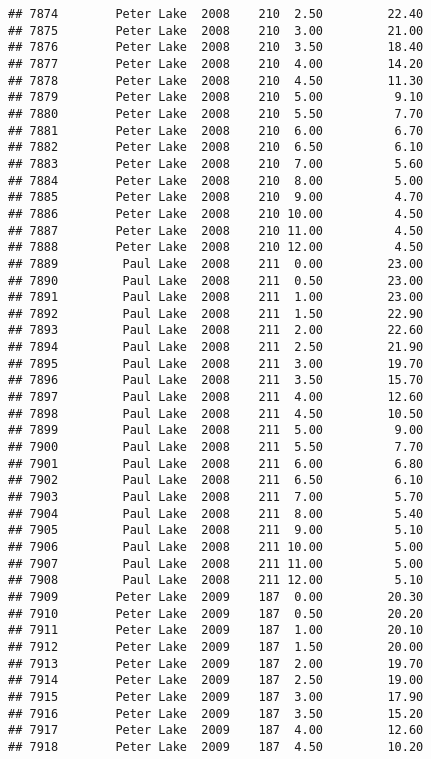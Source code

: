 \documentclass[
]{article}
\begin{document}
\begin{verbatim}
## 7874        Peter Lake  2008    210  2.50         22.40
## 7875        Peter Lake  2008    210  3.00         21.00
## 7876        Peter Lake  2008    210  3.50         18.40
## 7877        Peter Lake  2008    210  4.00         14.20
## 7878        Peter Lake  2008    210  4.50         11.30
## 7879        Peter Lake  2008    210  5.00          9.10
## 7880        Peter Lake  2008    210  5.50          7.70
## 7881        Peter Lake  2008    210  6.00          6.70
## 7882        Peter Lake  2008    210  6.50          6.10
## 7883        Peter Lake  2008    210  7.00          5.60
## 7884        Peter Lake  2008    210  8.00          5.00
## 7885        Peter Lake  2008    210  9.00          4.70
## 7886        Peter Lake  2008    210 10.00          4.50
## 7887        Peter Lake  2008    210 11.00          4.50
## 7888        Peter Lake  2008    210 12.00          4.50
## 7889         Paul Lake  2008    211  0.00         23.00
## 7890         Paul Lake  2008    211  0.50         23.00
## 7891         Paul Lake  2008    211  1.00         23.00
## 7892         Paul Lake  2008    211  1.50         22.90
## 7893         Paul Lake  2008    211  2.00         22.60
## 7894         Paul Lake  2008    211  2.50         21.90
## 7895         Paul Lake  2008    211  3.00         19.70
## 7896         Paul Lake  2008    211  3.50         15.70
## 7897         Paul Lake  2008    211  4.00         12.60
## 7898         Paul Lake  2008    211  4.50         10.50
## 7899         Paul Lake  2008    211  5.00          9.00
## 7900         Paul Lake  2008    211  5.50          7.70
## 7901         Paul Lake  2008    211  6.00          6.80
## 7902         Paul Lake  2008    211  6.50          6.10
## 7903         Paul Lake  2008    211  7.00          5.70
## 7904         Paul Lake  2008    211  8.00          5.40
## 7905         Paul Lake  2008    211  9.00          5.10
## 7906         Paul Lake  2008    211 10.00          5.00
## 7907         Paul Lake  2008    211 11.00          5.00
## 7908         Paul Lake  2008    211 12.00          5.10
## 7909        Peter Lake  2009    187  0.00         20.30
## 7910        Peter Lake  2009    187  0.50         20.20
## 7911        Peter Lake  2009    187  1.00         20.10
## 7912        Peter Lake  2009    187  1.50         20.00
## 7913        Peter Lake  2009    187  2.00         19.70
## 7914        Peter Lake  2009    187  2.50         19.00
## 7915        Peter Lake  2009    187  3.00         17.90
## 7916        Peter Lake  2009    187  3.50         15.20
## 7917        Peter Lake  2009    187  4.00         12.60
## 7918        Peter Lake  2009    187  4.50         10.20

\end{verbatim}
\end{document}
